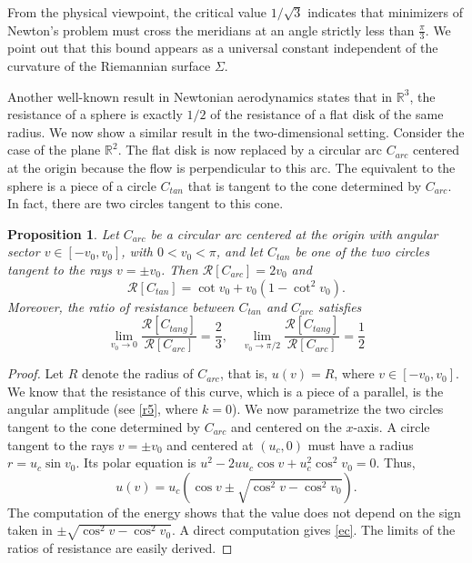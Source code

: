 \documentclass[a4paper,12pt]{amsart}
\newtheorem{proposition}[theorem]{Proposition}
\theoremstyle{definition}
\def\r{\mathbb R}
\def\R{\mathcal{ R}}
\begin{document}
 
From the physical viewpoint, the critical value $1/\sqrt{3}$  indicates that   minimizers of 
Newton's problem must cross the meridians at an angle   strictly less than $\frac{\pi}{3}$. 
We point out that this bound appears as a universal constant independent of the curvature of the Riemannian surface $\Sigma$.


 
 Another well-known result in Newtonian aerodynamics states that in $\mathbb{R}^3$, the resistance of a sphere is exactly $1/2$ of the resistance of a flat disk of the same radius. We now show a similar result in the two-dimensional setting. Consider the case of the plane $\r^2$. The flat disk is now replaced by a circular arc   $C_{arc}$ centered at the origin because the flow is perpendicular to this arc. The equivalent to the sphere is a piece of a circle $C_{tan}$ that is tangent to the cone determined by $C_{arc}$. In fact, there are two circles tangent to this cone.
 
 \begin{proposition} Let $C_{arc}$ be a circular arc centered at the origin with angular sector $v\in [-v_0,v_0]$, with $0<v_0<\pi$, and let $C_{tan}$ be one of the two circles tangent to the rays $v=\pm v_0$. Then $\R[C_{arc}]=2v_0$ and  
\begin{equation}\label{ec}
\R[C_{tan}]=\cot v_0 + v_0(1 - \cot^2 v_0).
\end{equation}
 Moreover, the ratio of resistance between $C_{tan}$ and $C_{arc}$ satisfies 
$$
 \lim_{v_0 \to 0} \frac{\R[C_{tang}]}{\R[C_{arc}]} = \frac{2}{3},\quad \lim_{v_0 \to \pi/2} \frac{\R[C_{tang}]}{\R[C_{arc}]} = \frac{1}{2}$$
 \end{proposition}
 
 \begin{proof}
 Let $R$ denote the radius of   $C_{arc}$, that is, $u(v)=R$, where $v\in [-v_0,v_0]$. We know that the resistance of this curve, which is a piece of a parallel, is the angular amplitude (see \eqref{r5}, where $k=0$). We now parametrize the two circles tangent to the cone determined by $C_{arc}$ and centered on the $x$-axis. A circle tangent to the rays $v = \pm v_0$ and centered at $(u_c, 0)$ must have a radius $r = u_c \sin v_0$. Its polar equation is $u^2 - 2u u_c \cos v + u_c^2 \cos^2 v_0 = 0$. Thus, 
\begin{equation}
u(v) = u_c \left( \cos v \pm \sqrt{\cos^2 v - \cos^2 v_0} \right) .
\end{equation}
The computation of the energy shows that the value does not depend on the sign taken in $ \pm \sqrt{\cos^2 v - \cos^2 v_0}$. A direct computation gives \eqref{ec}. The limits of the ratios of resistance are easily derived.
 
\end{proof}
\end{document}

